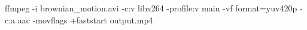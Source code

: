 ffmpeg -i brownian_motion.avi -c:v libx264 -profile:v main -vf format=yuv420p -c:a aac -movflags +faststart output.mp4

